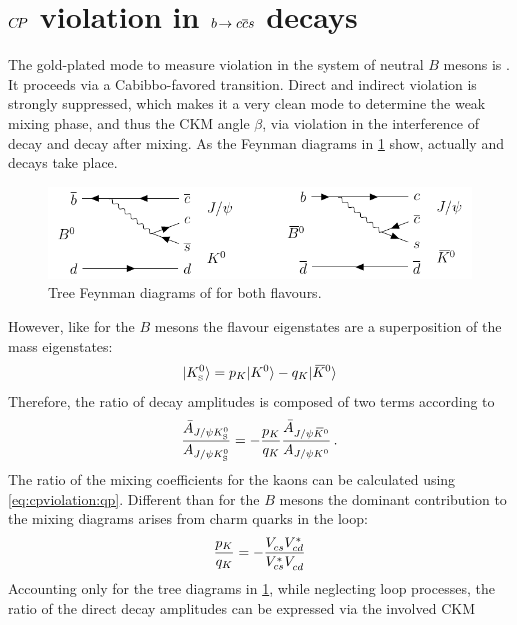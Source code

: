 
\section{\texorpdfstring{${C\!P}$}{CP} violation in \texorpdfstring{${b}\!\rightarrow {\ensuremath{c}}{\ensuremath{\overline {{c}}}}{\ensuremath{s}}$}{bToccbars} decays}
\label{sec:cpviolation:btoccbars}

The gold-plated mode to measure \CP violation in the system of neutral $B$
mesons is \BdToJPsiKS. It proceeds via a Cabibbo-favored \bToccbars
transition. Direct and indirect \CP violation is strongly suppressed, which
makes it a very clean mode to determine the weak mixing phase, and thus the
CKM angle $\beta$, via \CP violation in the interference of decay and decay
after mixing. As the Feynman diagrams in
\cref{fig:cpviolation:bd2jpsiks_feynmans} show, actually
\BdToJPsiKz and \BdbToJPsiKzb decays take place.
\begin{figure}[htb]
\centering
\includegraphics[width=\textwidth]{03-CPViolation/tikz/pdf/BdToJPsiKS_Feynmans.pdf}
\caption{Tree Feynman diagrams of \BdToJPsiKS for both flavours.}
\label{fig:cpviolation:bd2jpsiks_feynmans}
\end{figure}
However, like for the $B$ mesons the flavour eigenstates are a superposition
of the \CP mass eigenstates:
\begin{align}
	|{{K}^0_{\mathrm{ \scriptscriptstyle S}}}\rangle = p_K |{{K}^0}\rangle - q_K |{{\kern 0.2em\overline{\kern -0.2em K}{}}{}^0}\rangle
\end{align}
Therefore, the ratio of decay amplitudes is composed of two terms according to
\begin{align}
	\frac{\bar{A}_{J/\psi{\ensuremath{{K}^0_{\mathrm{ \scriptscriptstyle S}}}}}}{A_{J/\psi{\ensuremath{{K}^0_{\mathrm{ \scriptscriptstyle S}}}}}} = -\frac{p_K}{q_K}\frac{\bar{A}_{J/\psi{\ensuremath{{\kern 0.2em\overline{\kern -0.2em K}{}}{}^0}}}}{A_{J/\psi{\ensuremath{{K}^0}}}}\,.
\end{align}
The ratio of the mixing coefficients for the kaons can be calculated using
\cref{eq:cpviolation:qp}. Different than for the $B$ mesons the dominant
contribution to the mixing diagrams arises from charm quarks in the loop:
\begin{align}
	\frac{p_K}{q_K} = -\frac{{V_{{c}{s}}^{}}{V_{{c}{d}}^\ast}}{{V_{{c}{s}}^\ast}{V_{{c}{d}}^{}}}
\end{align}
Accounting only for the tree diagrams in
\cref{fig:cpviolation:bd2jpsiks_feynmans}, while neglecting loop processes,
the ratio of the direct decay amplitudes can be expressed via the involved CKM
